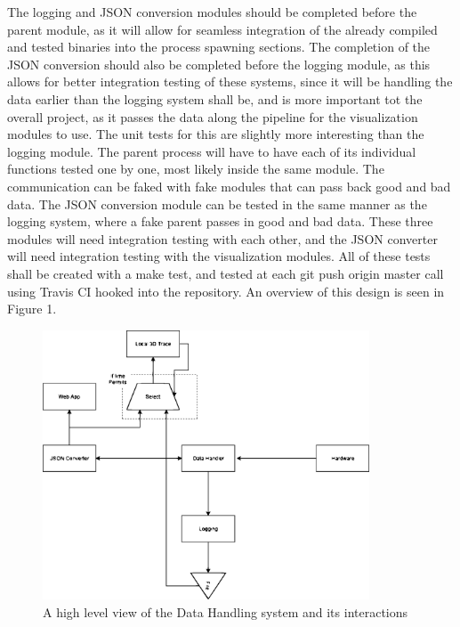 \documentclass[onecolumn, draftclsnofoot,10pt, compsoc]{IEEEtran}
\begin{document}
The logging and JSON conversion modules should be completed before the parent module, as it will allow for seamless integration of the already compiled and tested binaries into the process spawning sections. The completion of the JSON conversion should also be completed before the logging module, as this allows for better integration testing of these systems, since it will be handling the data earlier than the logging system shall be, and is more important tot the overall project, as it passes the data along the pipeline for the visualization modules to use. The unit tests for this are slightly more interesting than the logging module. The parent process will have to have each of its individual functions tested one by one, most likely inside the same module. The communication can be faked with fake modules that can pass back good and bad data. The JSON conversion module can be tested in the same manner as the logging system, where a fake parent passes in good and bad data. These three modules will need integration testing with each other, and the JSON converter will need integration testing with the visualization modules. All of these tests shall be created with a make test, and tested at each git push origin master call using Travis CI hooked into the repository.  
An overview of this design is seen in Figure 1. 

\begin{figure}[h]
    \centering
        \includegraphics[height=8cm]{datahandel}
        \caption{A high level view of the Data Handling system and its interactions}
        \label{fig:handel}
\end{figure}
\end{document}
